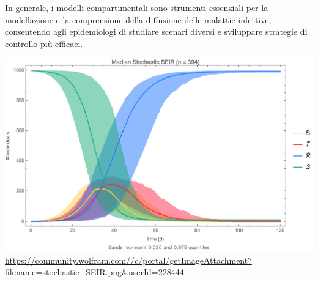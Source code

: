 In generale, i modelli compartimentali sono strumenti essenziali per la 
modellazione e la comprensione della diffusione delle malattie infettive, 
consentendo agli epidemiologi di studiare scenari diversi e sviluppare 
strategie di controllo più efficaci.

\begin{minipage}{\linewidth}
    \centering
    \includegraphics[width=\textwidth]{img/stochastic_SEIR.png}
    \url{https://community.wolfram.com//c/portal/getImageAttachment?filename=stochastic_SEIR.png&userId=228444}
    \label{fig:stochastic_SEIR_model}
\end{minipage}